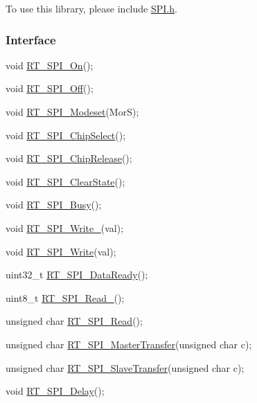 To use this library, please include {\ttfamily \mbox{\hyperlink{a00086}{S\+P\+I.\+h}}}.

\subsubsection*{Interface}


\begin{DoxyCode}
\textcolor{keywordtype}{void} \mbox{\hyperlink{a00086_a7e29e20d0901d972f48c7910ced01496}{RT\_SPI\_On}}();

\textcolor{keywordtype}{void} \mbox{\hyperlink{a00086_af62f1bbca0e2dc624d22fd41d9c4d673}{RT\_SPI\_Off}}();

\textcolor{keywordtype}{void} \mbox{\hyperlink{a00086_aaa4fe1ff7cdd82bb01d0e9c8b78f1c4e}{RT\_SPI\_Modeset}}(MorS);

\textcolor{keywordtype}{void} \mbox{\hyperlink{a00086_ab5011f13ab02a1c07b52047efb930cae}{RT\_SPI\_ChipSelect}}();

\textcolor{keywordtype}{void} \mbox{\hyperlink{a00086_aa1e150a8154edd8c379c587fa8aa476b}{RT\_SPI\_ChipRelease}}();

\textcolor{keywordtype}{void} \mbox{\hyperlink{a00086_a58a483e605dad12bcb7cb0c72645a391}{RT\_SPI\_ClearState}}();

\textcolor{keywordtype}{void} \mbox{\hyperlink{a00086_ab1ba89b5bfbcb4765f4c76685cba2955}{RT\_SPI\_Busy}}();

\textcolor{keywordtype}{void} \mbox{\hyperlink{a00086_a38a5e77ba10f0d47cf17a5e9865051a7}{RT\_SPI\_Write\_}}(val);

\textcolor{keywordtype}{void} \mbox{\hyperlink{a00086_a0b2995069d4992ea3676d5eb0a0aa568}{RT\_SPI\_Write}}(val);

uint32\_t \mbox{\hyperlink{a00086_ac5873263749266b505bf7389433ba8c0}{RT\_SPI\_DataReady}}();

uint8\_t \mbox{\hyperlink{a00086_aa54a442303e6bde4682c6e0cbe2bb3c5}{RT\_SPI\_Read\_}}();

\textcolor{keywordtype}{unsigned} \textcolor{keywordtype}{char} \mbox{\hyperlink{a00083_a12247c98a144c67f02e3c0783c430b17}{RT\_SPI\_Read}}();

\textcolor{keywordtype}{unsigned} \textcolor{keywordtype}{char} \mbox{\hyperlink{a00083_a61938c7db10cdb7d7281c7c796526b59}{RT\_SPI\_MasterTransfer}}(\textcolor{keywordtype}{unsigned} \textcolor{keywordtype}{char} c);

\textcolor{keywordtype}{unsigned} \textcolor{keywordtype}{char} \mbox{\hyperlink{a00083_a86a904500b912f32af83058779a01251}{RT\_SPI\_SlaveTransfer}}(\textcolor{keywordtype}{unsigned} \textcolor{keywordtype}{char} c);

\textcolor{keywordtype}{void} \mbox{\hyperlink{a00083_a348daf083179aab5d11d1e019c9b598b}{RT\_SPI\_Delay}}();
\end{DoxyCode}


